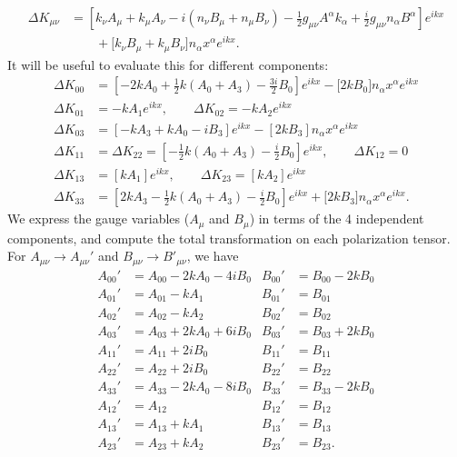 \documentclass[10pt,letterpaper]{article}
\begin{document}
\begin{align}
\Delta K_{\mu\nu} &= \left[ k_\nu A_\mu + k_\mu A_\nu - i \left( n_\nu B_\mu + n_\mu B_\nu\right) 
-\frac12 g_{\mu\nu} A^\alpha k_\alpha + \frac{i}{2} g_{\mu\nu}n_\alpha B^\alpha \right]e^{ikx}
\nonumber\\
&\qquad + \bigg[ k_\nu B_\mu + k_\mu B_\nu \bigg] n_\alpha x^\alpha e^{ikx}.
\end{align}
It will be useful to evaluate this for different components:
\begin{align}
\Delta K_{00} &=\left[ -2 kA_0 +\frac12 k(A_0 + A_3) - \frac{3i}{2} B_0\right]e^{ikx} - \bigg[2kB_0\bigg] n_\alpha x^\alpha e^{ikx}
\nonumber\\
\Delta K_{01} &=  -k A_1 e^{ikx},\qquad \Delta K_{02} =  -k A_2 e^{ikx}
\nonumber\\
\Delta K_{03} &= \left[ -kA_3 +kA_0 -i B_3\right]e^{ikx} - \left[2kB_3\right] n_\alpha x^\alpha e^{ikx}
\nonumber\\
\Delta K_{11} &= \Delta K_{22} =  \left[ - \frac12 k(A_0 + A_3) - \frac{i}{2}B_0 \right]  e^{ikx},\qquad \Delta K_{12} = 0
\nonumber\\
\Delta K_{13} &= [kA_1]e^{ikx},\qquad \Delta K_{23} = [kA_2]e^{ikx}
\nonumber\\
\Delta K_{33} &= \left[ 2kA_3 -\frac12 k(A_0+A_3) - \frac{i}{2}B_0\right]e^{ikx} + \bigg[2kB_3\bigg]n_\alpha x^\alpha e^{ikx}.
\end{align}
We express the gauge variables ($A_{\mu}$ and $B_{\mu}$) in terms of the 4 independent components, and compute the total transformation on each polarization tensor. For $A_{\mu\nu} \to A_{\mu\nu}'$ and $B_{\mu\nu} \to B'_{\mu\nu}$, we have
\begin{align}
A_{00}' &= A_{00} -2kA_0 - 4i B_0 			& B_{00}'&= B_{00} -2k B_0
\nonumber\\
A_{01}' &= A_{01} - kA_1							& B_{01}'&= B_{01} 
\nonumber\\
A_{02}' &= A_{02} - kA_2							&B_{02}'&= B_{02}
\nonumber\\
A_{03}' &= A_{03} +2kA_0 + 6i B_0			&B_{03}'&= B_{03} + 2kB_0
\nonumber \\
A_{11}' &= A_{11} + 2i B_0						&B_{11}'&= B_{11}
\nonumber\\
A_{22}' & = A_{22} +2iB_0						&B_{22}'&= B_{22}
\nonumber\\
A_{33}' &= A_{33}-2k A_0 - 8i B_0				&B_{33}'&= B_{33} - 2kB_0
\nonumber\\
A_{12}' &= A_{12}									&B_{12}'&=B_{12}
\nonumber\\
A_{13}' &= A_{13} + kA_1						&B_{13}'&=B_{13}
\nonumber\\
A_{23}' &= A_{23} + k A_2						&B_{23}'&=B_{23}.
\end{align}
\end{document}
